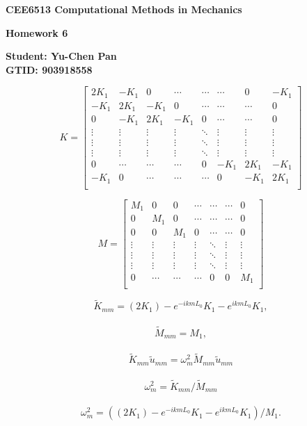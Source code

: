 \documentclass[12pt,fleqn]{article}
\date{}
\begin{document}
\vspace{-2cm}

\textbf{\Large CEE6513 Computational Methods in Mechanics}

\textbf{\Large Homework 6}

\textbf{Student: Yu-Chen Pan}
\textbf{\\GTID: 903918558}

\[
K = \begin{bmatrix}
    2K_1 			& -K_1			& 0				& \cdots 		& \cdots 			& \cdots 			& 0					& -K_1		\\
    -K_1	 	  		& 2K_1			& -K_1			& 0				& \cdots 			& \cdots 			& \cdots 			& 0			\\
    0		 			& -K_1			& 2K_1			& -K_1			& 0 					& \cdots 			& \cdots 			& 0    		\\
    \vdots  		& \vdots 		& \vdots 		& \vdots 		& \ddots 			& \vdots   			& \vdots 			& \vdots 	\\
    \vdots  		& \vdots 		& \vdots 		& \vdots 		& \ddots 			& \vdots   			& \vdots 			& \vdots 	\\
    \vdots  		& \vdots 		& \vdots 		& \vdots 		& \ddots 			& \vdots   			& \vdots 			& \vdots 	\\
    0					& \cdots		   & \cdots			& \cdots			& 0		 			& -K_1 				& 2K_1				&-K_1 		\\
    -K_1				& 0				& \cdots			& \cdots			& \cdots 			& 0	 				& -K_1				& 2K_1		\\
\end{bmatrix}
\]

\[
M = \begin{bmatrix}
    M_1  			& 0				& 0				& \cdots 		& \cdots 			& \cdots 			& 0					\\
    0		 	  		& M_1				& 0				& \cdots 		& \cdots 			& \cdots 			& 0		 			\\
    0		 			& 0				& M_1				& 0				&  \cdots			& \cdots 			& 0		 			\\
    \vdots  		& \vdots 		& \vdots 		& \vdots 		& \ddots 			& \vdots   			& \vdots 			\\
    \vdots  		& \vdots 		& \vdots 		& \vdots 		& \ddots 			& \vdots   			& \vdots 			\\
    \vdots  		& \vdots 		& \vdots 		& \vdots 		& \ddots 			& \vdots   			& \vdots 			\\
    0					& \cdots		   & \cdots			& \cdots			& 0		 			& 0	 				& M_1					\\
\end{bmatrix}
\]

\[
\tilde{K}_{mm} = (2K_1) - e^{-ikmL_0}K_{1} - e^{ikmL_0}K_{1},
\]
\\
\[
\tilde{M}_{mm} = M_{1},
\]
\\
\[
\tilde{K}_{mm} \tilde{u}_{mm} = \omega_m^2 \tilde{M}_{mm} \tilde{u}_{mm}
\]
\\
\[
\omega_m^2 = \tilde{K}_{mm} / \tilde{M}_{mm}
\]
\\
\[
\omega_m^2 = \left( (2K_1) - e^{-ikmL_0}K_1 - e^{ikmL_0}K_1 \right) / M_1.
\]
\end{document}
